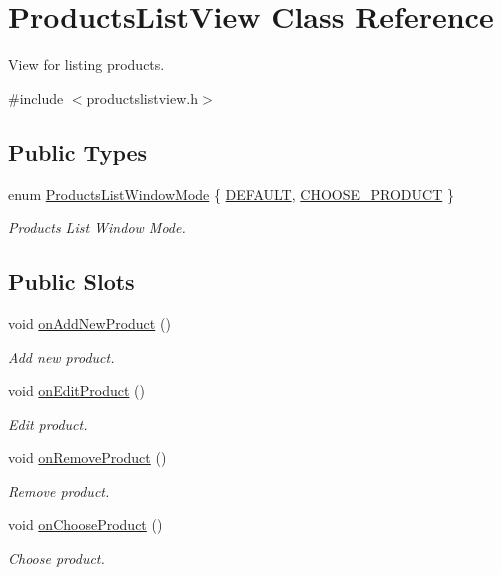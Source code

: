 \hypertarget{class_products_list_view}{\section{\-Products\-List\-View \-Class \-Reference}
\label{class_products_list_view}
}


\-View for listing products.  




{\ttfamily \#include $<$productslistview.\-h$>$}

\subsection*{\-Public \-Types}
\begin{DoxyCompactItemize}
\item 
enum \hyperlink{class_products_list_view_a9188ca0288825afb653acd945bfa9731}{\-Products\-List\-Window\-Mode} \{ \hyperlink{class_products_list_view_a9188ca0288825afb653acd945bfa9731a24e93e79a793541c2cd6ba9b733b2643}{\-D\-E\-F\-A\-U\-L\-T}, 
\hyperlink{class_products_list_view_a9188ca0288825afb653acd945bfa9731a713901de2ac101ea75f3520420dde2b3}{\-C\-H\-O\-O\-S\-E\-\_\-\-P\-R\-O\-D\-U\-C\-T}
 \}
\begin{DoxyCompactList}\small\item\em \-Products \-List \-Window \-Mode. \end{DoxyCompactList}\end{DoxyCompactItemize}
\subsection*{\-Public \-Slots}
\begin{DoxyCompactItemize}
\item 
void \hyperlink{class_products_list_view_a3d75554146c0a086b35394f3819b5e07}{on\-Add\-New\-Product} ()
\begin{DoxyCompactList}\small\item\em \-Add new product. \end{DoxyCompactList}\item 
void \hyperlink{class_products_list_view_a9e3b54dead778ff3f2d861cc0028dab9}{on\-Edit\-Product} ()
\begin{DoxyCompactList}\small\item\em \-Edit product. \end{DoxyCompactList}\item 
void \hyperlink{class_products_list_view_ac9699c5599b616805c68e4df4e59f0ab}{on\-Remove\-Product} ()
\begin{DoxyCompactList}\small\item\em \-Remove product. \end{DoxyCompactList}\item 
void \hyperlink{class_products_list_view_a6cb70505735dba1acee8233c719c2b30}{on\-Choose\-Product} ()
\begin{DoxyCompactList}\small\item\em \-Choose product. \end{DoxyCompactList}\end{DoxyCompactItemize}
